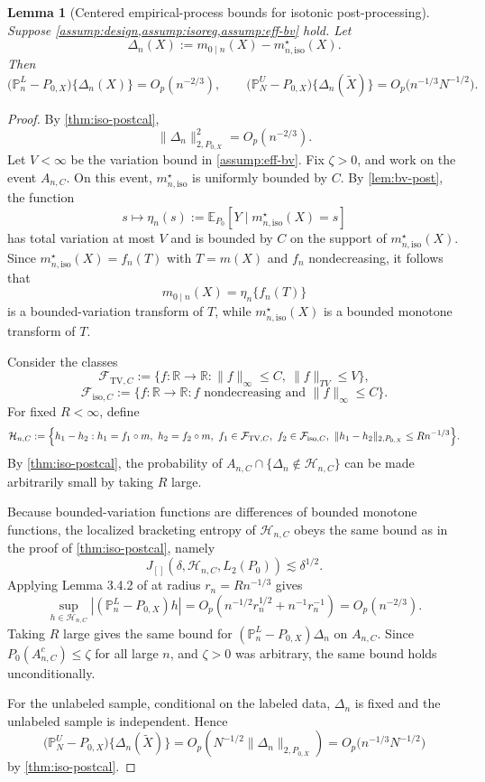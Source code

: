 \documentclass{article}
\theoremstyle{plain}
\newtheorem{lemma}{Lemma}
\theoremstyle{definition}
\newcommand{\E}{\mathbb{E}}
\newcommand{\R}{\mathbb{R}}
\newcommand{\1}{\mathbbm{1}}
\newcommand{\mhat}{m}
\newcommand{\Pl}{\mathbb{P}^{L}_n}
\newcommand{\Pu}{\mathbb{P}^{U}_N}
\newcommand{\Px}{P_{0,X}}
\begin{document}
\begin{lemma}[Centered empirical-process bounds for isotonic post-processing]
\label{lem:post-eprate}
Suppose \cref{assump:design,assump:isoreg,assump:eff-bv} hold. Let
\[
\Delta_n(X):=m_{0\mid n}(X)-m_{n,\mathrm{iso}}^\star(X).
\]
Then
\[
\bigl(\Pl-\Px\bigr)\{\Delta_n(X)\}=O_p(n^{-2/3}),
\qquad
\bigl(\Pu-\Px\bigr)\{\Delta_n(\widetilde X)\}=O_p\bigl(n^{-1/3}N^{-1/2}\bigr).
\]
\end{lemma}

\begin{proof}
By \cref{thm:iso-postcal},
\[
\|\Delta_n\|_{2,\Px}^2=O_p(n^{-2/3}).
\]
Let \(V<\infty\) be the variation bound in \cref{assump:eff-bv}. Fix \(\zeta>0\), and work on the event \(A_{n,C}\). On this event, \(m_{n,\mathrm{iso}}^\star\) is uniformly bounded by \(C\). By \cref{lem:bv-post}, the function
\[
s\mapsto \eta_n(s):=\E_{P_0}[Y\mid m_{n,\mathrm{iso}}^\star(X)=s]
\]
has total variation at most \(V\) and is bounded by \(C\) on the support of \(m_{n,\mathrm{iso}}^\star(X)\). Since \(m_{n,\mathrm{iso}}^\star(X)=f_n(T)\) with \(T=\mhat(X)\) and \(f_n\) nondecreasing, it follows that
\[
m_{0\mid n}(X)=\eta_n\{f_n(T)\}
\]
is a bounded-variation transform of \(T\), while \(m_{n,\mathrm{iso}}^\star(X)\) is a bounded monotone transform of \(T\).

Consider the classes
\[
\mathcal F_{\mathrm{TV},C}
:=
\{f:\R\to\R:\|f\|_\infty\le C,\ \|f\|_{TV}\le V\},
\]
\[
\mathcal F_{\mathrm{iso},C}
:=
\{f:\R\to\R:\text{$f$ nondecreasing and }\|f\|_\infty\le C\}.
\]
For fixed \(R<\infty\), define
\[
\mathcal H_{n,C}
:=
\Bigl\{
h_1-h_2:
h_1=f_1\circ\mhat,\ h_2=f_2\circ\mhat,\
f_1\in\mathcal F_{\mathrm{TV},C},\
f_2\in\mathcal F_{\mathrm{iso},C},\
\|h_1-h_2\|_{2,\Px}\le Rn^{-1/3}
\Bigr\}.
\]
By \cref{thm:iso-postcal}, the probability of \(A_{n,C}\cap\{\Delta_n\notin\mathcal H_{n,C}\}\) can be made arbitrarily small by taking \(R\) large.

Because bounded-variation functions are differences of bounded monotone functions, the localized bracketing entropy of \(\mathcal H_{n,C}\) obeys the same bound as in the proof of \cref{thm:iso-postcal}, namely
\[
J_{[]}(\delta,\mathcal H_{n,C},L_2(P_0))\lesssim \delta^{1/2}.
\]
Applying Lemma 3.4.2 of \citet{vdvwellner1996} at radius \(r_n=Rn^{-1/3}\) gives
\[
\sup_{h\in\mathcal H_{n,C}}|(\Pl-\Px)h|
=O_p\!\left(n^{-1/2}r_n^{1/2}+n^{-1}r_n^{-1}\right)
=O_p(n^{-2/3}).
\]
Taking \(R\) large gives the same bound for \((\Pl-\Px)\Delta_n\) on \(A_{n,C}\).
Since \(P_0(A_{n,C}^c)\le \zeta\) for all large \(n\), and \(\zeta>0\) was arbitrary, the same bound holds unconditionally.

For the unlabeled sample, conditional on the labeled data, \(\Delta_n\) is fixed and the unlabeled sample is independent. Hence
\[
\bigl(\Pu-\Px\bigr)\{\Delta_n(\widetilde X)\}
=
O_p\left(N^{-1/2}\|\Delta_n\|_{2,\Px}\right)
=
O_p\bigl(n^{-1/3}N^{-1/2}\bigr)
\]
by \cref{thm:iso-postcal}.
\end{proof}
\end{document}
